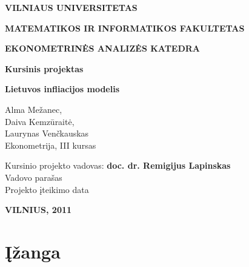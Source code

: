 \documentclass[a4paper]{article}
\begin{document}
\begin{titlepage}

\vskip 20pt
\centerline{\bf \large VILNIAUS UNIVERSITETAS}
\bigskip
\centerline{\large \textbf{MATEMATIKOS IR INFORMATIKOS FAKULTETAS}}
\bigskip
\centerline{\large \textbf{EKONOMETRINĖS ANALIZĖS KATEDRA}}
\vskip 120pt
\centerline{\bf \Large \textbf{Kursinis projektas}}
\vskip 50pt

\begin{center}
{\bf \LARGE Lietuvos infliacijos modelis}
\end{center}

\bigskip
\begin{center}
\large Alma Mežanec, \\
\large Daiva Kemzūraitė,	\\
\large Laurynas Venčkauskas\\
\bigskip
\large Ekonometrija, III kursas
\end{center}
\vskip 90pt
\begin{flushleft}
\large Kursinio projekto vadovas: \textbf{doc. dr. Remigijus Lapinskas}\\
\large Vadovo parašas \underline{\hskip 114pt}\\
\large Projekto įteikimo data \underline{\hskip 114pt}
\end{flushleft}
\vfill
\centerline{\large \textbf{VILNIUS, 2011}}
\end{titlepage}

\tableofcontents
\newpage

\section{Įžanga}
\end{document}
